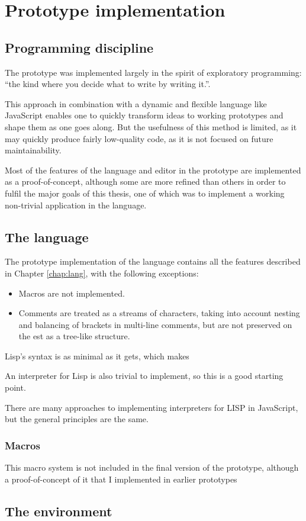 \chapter{Prototype implementation}\label{chap:impl}

\section{Programming discipline}
The prototype was implemented largely in the spirit of exploratory programming:
``the kind where you decide what to write by writing
it.''\cite{arc}.

This approach in combination with a dynamic and flexible language like
JavaScript enables one to quickly transform ideas to working prototypes and
shape them as one goes along. But the usefulness of this method is limited, as
it may quickly produce fairly low-quality code, as it is not focused on future
maintainability.

Most of the features of the language and editor in the prototype are implemented
as a proof-of-concept, although some are more refined than others in order to
fulfil the major goals of this thesis, one of which was to implement a working
non-trivial application in the language.

\section{The language}
The prototype implementation of the language contains all the features described in Chapter \ref{chap:lang}, with the following exceptions:
\begin{itemize}
    \item Macros are not implemented.
    \item Comments are treated as a streams of characters, taking into account nesting and balancing of brackets in multi-line comments, but are not preserved on the \acrshort{est} as a tree-like structure.
\end{itemize}

Lisp's syntax is as minimal as it gets\cite{syntaxation}, which makes 

An interpreter for Lisp is also trivial to implement, so this is a good starting
point.

There are many approaches to implementing interpreters for LISP in
JavaScript\cite{js_lisps}, but the general principles are the same.

\subsection{Macros}
This
macro system is not included in the final version of the prototype, although a
proof-of-concept of it that I implemented in earlier prototypes

\section{The environment}

